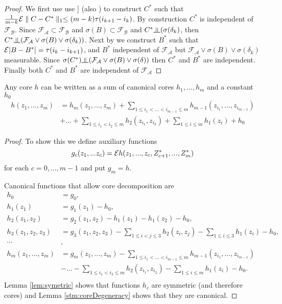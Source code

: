 \begin{proof}
We first use use  \cite[Equation 2.1]{leucht_dependent_2013}] (also \cite[Lemma 5.3]{dedecker2007weak}) to construct $C^*$ such that $\frac{1} {m-k}  \mathcal{E} \parallel C-C^* \parallel_1 \leq (m-k) \tau(i_{k+1}-i_k)$. By construction $C^*$ is independent of $\mathcal{F_B}$. Since $ \mathcal{F_A} \subset \mathcal{F_B}$ and $ \sigma(B) \subset \mathcal{F_B}$ and $C^* \indep (\sigma(\delta_k) $, then $C^* \indep  (\mathcal{F_A} \vee \sigma(B)  \vee \sigma(\delta_k)  )$. Next by \cite[Lemma 5.2]{dedecker2007weak} we construct $B^*$  such  that $\mathcal{E} |B-B^*| = \tau(i_{k} -i_{k+1})$, and $B^*$  independent  of $\mathcal{F_A}$ but $\mathcal{F_A} \vee \sigma(B) \vee \sigma(\delta_k)$ measurable. Since   $\sigma(C^*) \indep (\mathcal{F_A} \vee \sigma(B) \vee \sigma(\delta)) $ then $C^*$ and $B^*$ are independent. Finally both $C^*$ and $B^*$ are independent of $\mathcal{F_A}$   
\end{proof}

\begin{lemma}
\label{lem:Components}\cite[Section 5.1.5]{serfling80}
Any core $h$ can be written as a sum of canonical cores $h_1,...,h_m$ and a constant $h_0$
\begin{align*}
h(z_1,...,z_m) &=   h_m(z_1,...,z_m) + \sum_{1 \leq i_1 < ...<i_{m-1} \leq m } h_{m-1}(z_{i_1},...,z_{i_{m-1}}) \\ 
    & + ... + \sum_{1 \leq i_1 < i_2 \leq m } h_2(z_{i_1},z_{i_2}) + \sum_{1 \leq i \leq m} h_1(z_i)+h_0
\end{align*} 
\end{lemma}

\begin{proof}
To show this we define auxiliary functions
\[
 g_c(z_1,...z_c) = \mathcal{E} h(z_1,...,z_c,Z_{c+1}^*,...,Z_{m}^*)
\]
for each $c=0,...,m-1$ and put $g_m=h$.  

Canonical functions that allow core decomposition are 
\begin{align}
   h_0 &= g_0, \\  
   h_1(z_1) &= g_1(z_1) -h_0,\\
   h_2(z_1,z_2) &= g_2(z_1,z_2)  - h_1(z_1) - h_1(z_2)-h_0, \\  
   h_3(z_1,z_2,z_3) &= g_3(z_1,z_2,z_3) - \sum_{1 \leq i < j \leq 3 } h_2(z_i,z_j) - \sum_{1\leq i \leq 3} h_1(z_i)-h_0, \\ 
   \cdots &, \\
   h_m(z_1,...,z_m) &= g_m(z_1,...,z_m) - \sum_{1 \leq i_1 < ...<i_{m-1} \leq m } h_{m-1}(z_{i_1},...,z_{i_{m-1}}) \\ 
    & - ... - \sum_{1 \leq i_1 < i_2 \leq m } h_2(z_{i_1},z_{i_2}) - \sum_{1 \leq i \leq m} h_1(z_i)-h_0.\\
\end{align}
Lemma \ref{lem:symetric} shows that functions $h_c$ are symmetric (and therefore cores) and Lemma \ref{stm:coreDegeneracy} shows that they are canonical.  
\end{proof}

